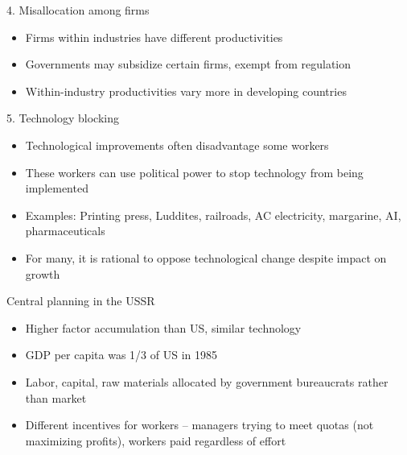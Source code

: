 \documentclass[10pt]{beamer}
\begin{document}
\begin{frame}[label={sec:org2068f60}]{}
\alert{4. Misallocation among firms}
\begin{itemize}
\item Firms within industries have different productivities
\item Governments may subsidize certain firms, exempt from regulation
\item Within-industry productivities vary more in developing countries
\end{itemize}
\end{frame}

\begin{frame}[label={sec:orgbaf0b93}]{}
\alert{5. Technology blocking}
\begin{itemize}
\item Technological improvements often disadvantage some workers
\item These workers can use political power to stop technology from being implemented
\item Examples: Printing press, Luddites, railroads, AC electricity, margarine, AI, pharmaceuticals
\item For many, it is rational to oppose technological change despite impact on growth
\end{itemize}
\end{frame}

\begin{frame}[label={sec:orge1cd1bf}]{}
\alert{Central planning in the USSR}
\begin{itemize}
\item Higher factor accumulation than US, similar technology
\item GDP per capita was 1/3 of US in 1985
\item Labor, capital, raw materials allocated by government bureaucrats rather than market
\item Different incentives for workers -- managers trying to meet quotas (not maximizing profits), workers paid regardless of effort
\end{itemize}
\end{frame}
\end{document}
